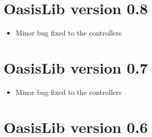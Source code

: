 \section{OasisLib version 0.8}
\begin{itemize}
	\item Minor bug fixed to the controllers
\end{itemize}
\section{OasisLib version 0.7}
\begin{itemize}
	\item Minor bug fixed to the controllers
\end{itemize}
\section{OasisLib version 0.6}
